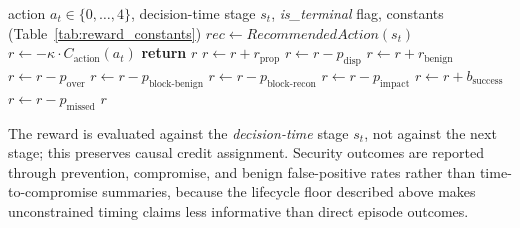 \begin{algorithm}[!htbp]
\caption{Per-step reward computation: the full shaped reward signal, with the sparse outcome-only reward stripping the stage-conditioned shaping}
\label{alg:reward}
\begin{algorithmic}
\REQUIRE action $a_t \in \{0,\ldots,4\}$, decision-time stage $s_t$, \textit{is\_terminal} flag, constants (Table~\ref{tab:reward_constants})
\STATE {}
\STATE $\mathit{rec} \leftarrow \mathit{RecommendedAction}(s_t)$ 
\STATE $r \leftarrow -\kappa \cdot C_{\mathrm{action}}(a_t)$ 
    \STATE \textbf{return} $r$ 
\ENDIF
\STATE {}
    \STATE $r \leftarrow r + r_{\mathrm{prop}}$ 
    \STATE $r \leftarrow r - p_{\mathrm{disp}}$ 
\ENDIF
{}
        \STATE $r \leftarrow r + r_{\mathrm{benign}}$ 
        \STATE $r \leftarrow r - p_{\mathrm{over}}$ 
    \ENDIF
        \STATE $r \leftarrow r - p_{\mathrm{block\text{-}benign}}$ 
    \ENDIF
\ENDIF
{}
    \STATE $r \leftarrow r - p_{\mathrm{block\text{-}recon}}$ 
\ENDIF
{}
    \STATE $r \leftarrow r - p_{\mathrm{impact}}$ 
        \STATE $r \leftarrow r + b_{\mathrm{success}}$ 
        \STATE $r \leftarrow r - p_{\mathrm{missed}}$ 
    \ELSE
        \STATE {}
    \ENDIF
\ENDIF
\RETURN $r$
\end{algorithmic}
\end{algorithm}

The reward is evaluated against the \emph{decision-time} stage $s_t$, not against the next stage; this preserves causal credit assignment. Security outcomes are reported through prevention, compromise, and benign false-positive rates rather than time-to-compromise summaries, because the lifecycle floor described above makes unconstrained timing claims less informative than direct episode outcomes.

